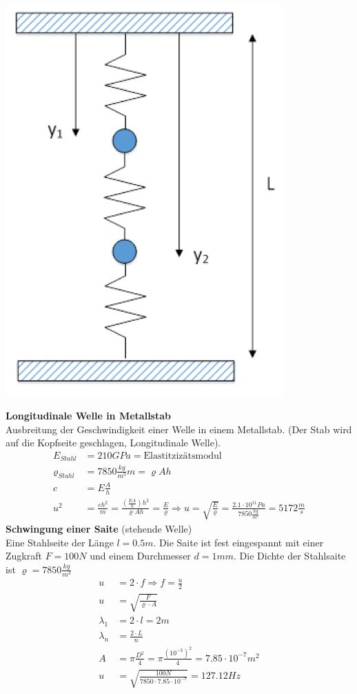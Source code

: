 \begin{minipage}{0.29\textwidth}
\includegraphics[width = 0.8\textwidth]{bilder/a91.png}
\end{minipage}





\textbf{Longitudinale Welle in Metallstab}\\
Ausbreitung der Geschwindigkeit einer Welle in einem Metallstab. (Der Stab wird auf die Kopfseite geschlagen, Longitudinale Welle).
\begin{align*}
E_{Stahl} &= 210GPa = \textrm{Elastitzizätsmodul}\\
\varrho_{Stahl} &= 7850 \frac{kg}{m^3}
m = \varrho A h \\
c &= E \frac{A}{h}\\
u^2 &= \frac{ch^2}{m} = \frac{(\frac{EA}{h})h^2}{\varrho A h} = \frac{E}{\varrho}  \Rightarrow u = \sqrt{\frac{E}{\varrho}} =\frac{2.1\cdot 10^11 Pa}{7850 \frac{kg}{m^3}} = 5172\frac{m}{s}
\end{align*}
\textbf{Schwingung einer Saite} (stehende Welle)\\
Eine Stahlseite der Länge $l=0.5m$. Die Saite ist fest eingespannt mit einer Zugkraft $F= 100N$ und einem Durchmesser $d=1mm$. Die Dichte der Stahlsaite ist $\varrho = 7850\frac{kg}{m^3}$
\begin{align*}
u&=2\cdot f \Rightarrow f = \frac{u}{2}\\
u&= \sqrt{\frac{F}{\varrho\cdot A}}\\
\lambda_1&= 2\cdot l = 2m\\
\lambda_n &= \frac{2\cdot L}{n}\\
A &= \pi\frac{D^2}{4} = \pi \frac{(10^{-3})^2}{4} = 7.85\cdot 10^{-7}m^2\\
u&= \sqrt{\frac{100N}{7850\cdot 7.85\cdot 10^{-7}}}=127.12 Hz
\end{align*}

